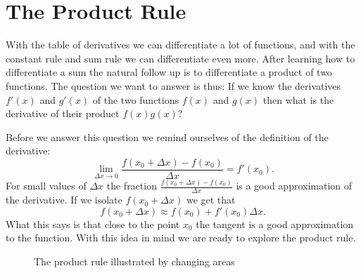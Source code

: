 \documentclass[main.tex]{subfiles}
\begin{document}
\section{The Product Rule}
With the table of derivatives we can differentiate a lot of functions, and with the constant rule and sum rule we can differentiate even more. After learning how to differentiate a sum the natural follow up is to differentiate a product of two functions. The question we want to answer is thus: If we know the derivatives $f'(x)$ and $g'(x)$ of the two functions $f(x)$ and $g(x)$ then what is the derivative of their product $f(x) g(x)$?

Before we answer this question we remind ourselves of the definition of the derivative:
\begin{equation}
\lim_{\Delta x \to 0} \frac{f(x_0 + \Delta x) - f(x_0)}{\Delta x} = f'(x_0).
\end{equation}
For small values of $\Delta x$ the fraction $\frac{f(x_0 + \Delta x) - f(x_0)}{\Delta x}$ is a good approximation of the derivative. If we isolate $f(x_0 + \Delta x)$ we get that
\begin{equation}\label{linapprox}
f(x_0 + \Delta x) \approx f(x_0) + f'(x_0) \Delta x.
\end{equation}
What this says is that close to the point $x_0$ the tangent is a good approximation to the function. With this idea in mind we are ready to explore the product rule.

\begin{figure}
\begin{center}
\caption{The product rule illustrated by changing areas} \label{fig:prodRule}
\end{center}
\end{figure}
\end{document}
